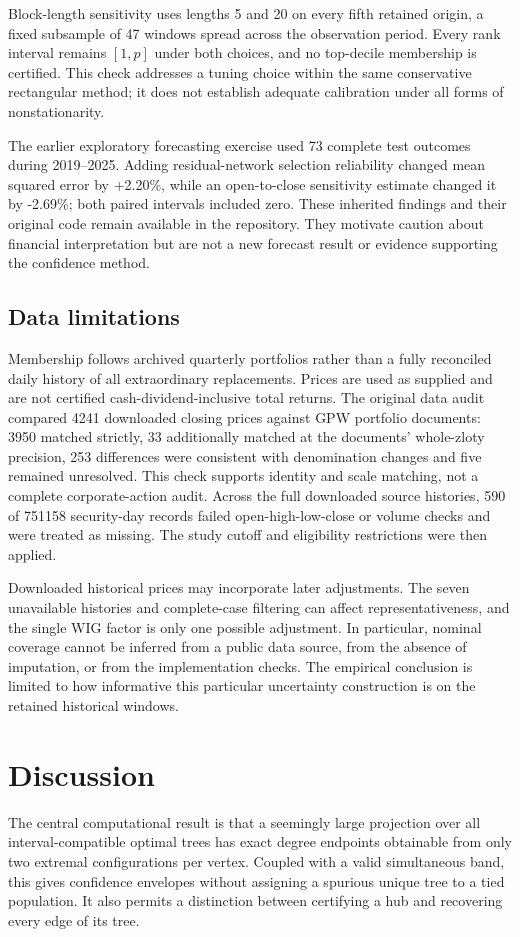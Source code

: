 \documentclass[pdflatex,sn-mathphys-ay]{sn-jnl}
\theoremstyle{thmstyleone}
\theoremstyle{thmstyletwo}
\begin{document}
Block-length sensitivity uses lengths 5 and 20 on every fifth retained origin, a fixed subsample of 47 windows spread across the observation period. Every rank interval remains $[1,p]$ under both choices, and no top-decile membership is certified. This check addresses a tuning choice within the same conservative rectangular method; it does not establish adequate calibration under all forms of nonstationarity.

The earlier exploratory forecasting exercise used 73 complete test outcomes during 2019--2025. Adding residual-network selection reliability changed mean squared error by +2.20\%, while an open-to-close sensitivity estimate changed it by -2.69\%; both paired intervals included zero. These inherited findings and their original code remain available in the repository. They motivate caution about financial interpretation but are not a new forecast result or evidence supporting the confidence method.

\subsection{Data limitations}
Membership follows archived quarterly portfolios rather than a fully reconciled daily history of all extraordinary replacements. Prices are used as supplied and are not certified cash-dividend-inclusive total returns. The original data audit compared 4241 downloaded closing prices against GPW portfolio documents: 3950 matched strictly, 33 additionally matched at the documents' whole-zloty precision, 253 differences were consistent with denomination changes and five remained unresolved. This check supports identity and scale matching, not a complete corporate-action audit. Across the full downloaded source histories, 590 of 751158 security-day records failed open-high-low-close or volume checks and were treated as missing. The study cutoff and eligibility restrictions were then applied.

Downloaded historical prices may incorporate later adjustments. The seven unavailable histories and complete-case filtering can affect representativeness, and the single WIG factor is only one possible adjustment. In particular, nominal coverage cannot be inferred from a public data source, from the absence of imputation, or from the implementation checks. The empirical conclusion is limited to how informative this particular uncertainty construction is on the retained historical windows.

\section{Discussion}\label{sec:discussion}
The central computational result is that a seemingly large projection over all interval-compatible optimal trees has exact degree endpoints obtainable from only two extremal configurations per vertex. Coupled with a valid simultaneous band, this gives confidence envelopes without assigning a spurious unique tree to a tied population. It also permits a distinction between certifying a hub and recovering every edge of its tree.
\end{document}
